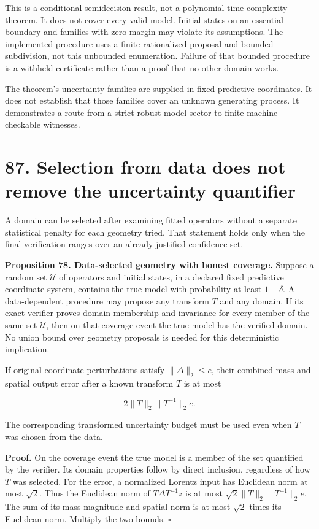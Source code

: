 \documentclass[11pt,letterpaper]{article}
\begin{document}
This is a conditional semidecision result, not a polynomial-time
complexity theorem. It does not cover every valid model. Initial states
on an essential boundary and families with zero margin may violate its
assumptions. The implemented procedure uses a finite rationalized
proposal and bounded subdivision, not this unbounded enumeration.
Failure of that bounded procedure is a withheld certificate rather than
a proof that no other domain works.

The theorem's uncertainty families are supplied in fixed predictive
coordinates. It does not establish that those families cover an unknown
generating process. It demonstrates a route from a strict robust model
sector to finite machine-checkable witnesses.

\section{87. Selection from data does not remove the uncertainty
quantifier}\label{selection-from-data-does-not-remove-the-uncertainty-quantifier}

A domain can be selected after examining fitted operators without a
separate statistical penalty for each geometry tried. That statement
holds only when the final verification ranges over an already justified
confidence set.

\textbf{Proposition 78. Data-selected geometry with honest coverage.}
Suppose a random set \(\mathcal U\) of operators and initial states, in
a declared fixed predictive coordinate system, contains the true model
with probability at least \(1-\delta\). A data-dependent procedure may
propose any transform \(T\) and any domain. If its exact verifier proves
domain membership and invariance for every member of the same set
\(\mathcal U\), then on that coverage event the true model has the
verified domain. No union bound over geometry proposals is needed for
this deterministic implication.

If original-coordinate perturbations satisfy \(\|\Delta\|_2\leq e\),
their combined mass and spatial output error after a known transform
\(T\) is at most

\[
\boxed{2\|T\|_2\|T^{-1}\|_2 e.}
\]

The corresponding transformed uncertainty budget must be used even when
\(T\) was chosen from the data.

\textbf{Proof.} On the coverage event the true model is a member of the
set quantified by the verifier. Its domain properties follow by direct
inclusion, regardless of how \(T\) was selected. For the error, a
normalized Lorentz input has Euclidean norm at most \(\sqrt2\). Thus the
Euclidean norm of \(T\Delta T^{-1}z\) is at most
\(\sqrt2\|T\|_2\|T^{-1}\|_2e\). The sum of its mass magnitude and
spatial norm is at most \(\sqrt2\) times its Euclidean norm. Multiply
the two bounds. \(\square\)
\end{document}
